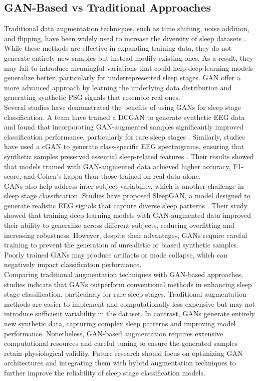 \subsection{GAN-Based vs Traditional Approaches}

Traditional data augmentation techniques, such as time shifting, noise addition, and flipping, have been widely used to increase the diversity of sleep datasets \parencite{ling2022staging}. While these methods are effective in expanding training data, they do not generate entirely new samples but instead modify existing ones. As a result, they may fail to introduce meaningful variations that could help deep learning models generalize better, particularly for underrepresented sleep stages. GAN offer a more advanced approach by learning the underlying data distribution and generating synthetic PSG signals that resemble real ones. \\

Several studies have demonstrated the benefits of using GANs for sleep stage classification. A team have trained a \ac{DCGAN} to generate synthetic EEG data and found that incorporating GAN-augmented samples significantly improved classification performance, particularly for rare sleep stages \parencite{du2024data}. Similarly, studies have used a \ac{cGAN} to generate class-specific EEG spectrograms, ensuring that synthetic samples preserved essential sleep-related features \parencite{fu2021conditional}. Their results showed that models trained with GAN-augmented data achieved higher accuracy, F1-score, and Cohen’s kappa than those trained on real data alone. \\

GANs also help address inter-subject variability, which is another challenge in sleep stage classification. Studies have proposed SleepGAN, a model designed to generate realistic EEG signals that capture diverse sleep patterns \parencite{cheng2024sleepegan}. Their study showed that training deep learning models with GAN-augmented data improved their ability to generalize across different subjects, reducing overfitting and increasing robustness. However, despite their advantages, GANs require careful training to prevent the generation of unrealistic or biased synthetic samples. Poorly trained GANs may produce artifacts or mode collapse, which can negatively impact classification performance. \\

Comparing traditional augmentation techniques with GAN-based approaches, studies indicate that GANs outperform conventional methods in enhancing sleep stage classification, particularly for rare sleep stages. Traditional augmentation methods are easier to implement and computationally less expensive but may not introduce sufficient variability in the dataset. In contrast, GANs generate entirely new synthetic data, capturing complex sleep patterns and improving model performance. Nonetheless, GAN-based augmentation requires extensive computational resources and careful tuning to ensure the generated samples retain physiological validity. Future research should focus on optimizing GAN architectures and integrating them with hybrid augmentation techniques to further improve the reliability of sleep stage classification models.

